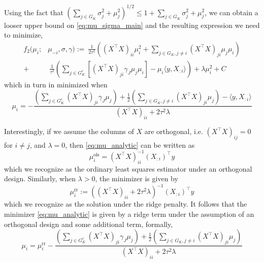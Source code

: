 \documentclass[12pt]{article}
\begin{document}
Using the fact that $ \left( \sum_{j \in G_K} \sigma_j^2 + \mu_j^2 \right)^{1/2} \leq 1 + \sum_{j \in G_K} \sigma_j^2 + \mu_j^2 $, we can obtain a looser upper bound on \eqref{eq:mu_sigma_main} and the resulting expression we need to minimize,
\begin{equation}
\begin{aligned}
    f_2(\mu_i; & \mu_{-i}, \sigma, \gamma) :=\
    \frac{1}{2\tau^2} \left(
	(X^\top X)_{ii} \mu_i^2 + 
	\sum_{j \in G_K, j\neq i} (X^\top X)_{ji} \mu_j \mu_i
    \right) \\
+ &\
    \frac{1}{\tau^2} \left(
	\sum_{j \in G_K^c} \left[ (X^\top X)_{ji} \gamma_{J} \mu_j \mu_i \right] -
	\mu_i \langle y, X_{:i} \rangle   
    \right)
+
    \lambda \mu_i^2 + C
\end{aligned}
\end{equation}
which in turn in minimized when
\begin{equation} \label{eq:mu_analytic}
    \mu_i =
    - \frac{
	\left(\sum_{j \in G_K^c} (X^\top X)_{ji} \gamma_{J} \mu_j \right) +
	\frac{1}{2} \left(\sum_{j \in G_K, j\neq i} (X^\top X)_{ji} \mu_j \right)-
	\langle y, X_{:i} \rangle 
    }{
	(X^\top X)_{ii} +
	2 \tau^2 \lambda 
    }
\end{equation}

Interestingly, if we assume the columns of $X$ are orthogonal, i.e. $ (X^\top X)_{ij} = 0$ for $i \neq j$, and $\lambda = 0$, then \eqref{eq:mu_analytic} can be written as
\begin{equation}
    \mu_i^{\text{ols}} = (X^\top X)_{ii}^{-1} (X_{:i})^\top y
\end{equation}
which we recognize as the ordinary least squares estimator under an orthogonal design. Similarly, when $\lambda > 0$, the minimizer is given by
\begin{equation}
    \mu_i^{\text{rr}} := \left((X^\top X)_{ii} + 2\tau^2 \lambda \right)^{-1} (X_{:i})^\top y
\end{equation}
which we recognize as the solution under the ridge penalty. It follows that the minimizer \eqref{eq:mu_analytic} is given by a ridge term under the assumption of an orthogonal design and some additional term, formally,
\begin{equation}
    \mu_i = \mu_i^{\text{rr}} - \frac{
	\left(\sum_{j \in G_K^c} (X^\top X)_{ji} \gamma_{J} \mu_j \right) +
	\frac{1}{2} \left(\sum_{j \in G_K, j\neq i} (X^\top X)_{ji} \mu_j \right)
    }{
	(X^\top X)_{ii} +
	2 \tau^2 \lambda 
    }
\end{equation}
\end{document}
